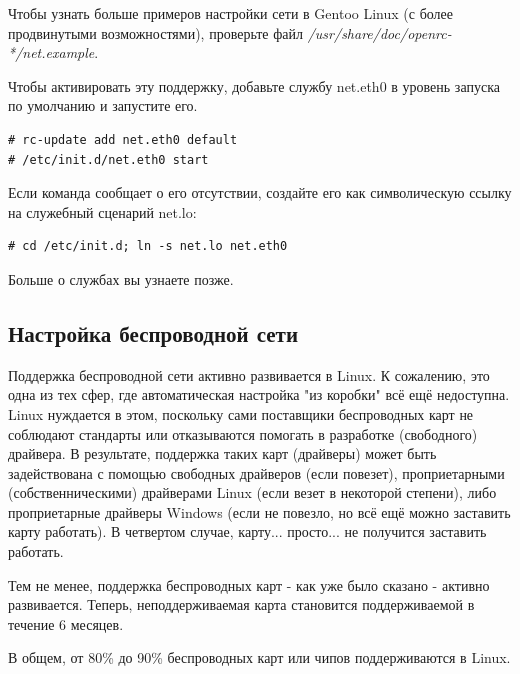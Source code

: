 \documentclass[10pt]{book}
\begin{document}
Чтобы узнать больше примеров настройки сети в Gentoo Linux (с более продвинутыми возможностями), проверьте файл \textit{/usr/share/doc/openrc-*/net.example}.

Чтобы активировать эту поддержку, добавьте службу net.eth0 в уровень запуска по умолчанию и запустите его.

\begin{tcolorbox}
\begin{lstlisting}
# rc-update add net.eth0 default
# /etc/init.d/net.eth0 start
\end{lstlisting}
\end{tcolorbox}

Если команда сообщает о его отсутствии, создайте его как символическую ссылку на служебный сценарий net.lo:

\begin{tcolorbox}
\begin{lstlisting}
# cd /etc/init.d; ln -s net.lo net.eth0
\end{lstlisting}
\end{tcolorbox}

Больше о службах вы узнаете позже.

\subsection{Настройка беспроводной сети}
Поддержка беспроводной сети активно развивается в Linux. К сожалению, это одна из тех сфер, где автоматическая настройка "из коробки" всё ещё недоступна. Linux нуждается в этом, поскольку сами поставщики беспроводных карт не соблюдают стандарты или отказываются помогать в разработке (свободного) драйвера. В результате, поддержка таких карт (драйверы) может быть задействована с помощью свободных драйверов (если повезет), проприетарными (собственническими) драйверами Linux (если везет в некоторой степени), либо проприетарные драйверы Windows (если не повезло, но всё ещё можно заставить карту работать). В четвертом случае, карту... просто... не получится заставить работать. 

Тем не менее, поддержка беспроводных карт - как уже было сказано - активно развивается. Теперь, неподдерживаемая карта становится поддерживаемой в течение 6 месяцев. 

В общем, от 80\% до 90\% беспроводных карт или чипов поддерживаются в Linux.
\end{document}

